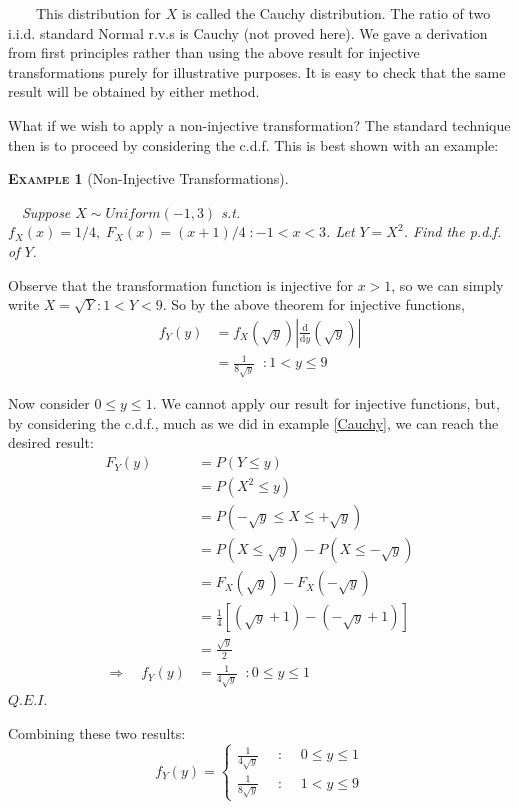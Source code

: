 \documentclass[12pt,a4paper]{article}
\newtheorem{example}{\textsc{Example}}[section]
\begin{document}
$\qquad$This distribution for $X$ is called the Cauchy distribution. The ratio of two i.i.d. standard Normal r.v.s is Cauchy (not proved here). We gave a derivation from first principles rather than using the above result for injective transformations purely for illustrative purposes. It is easy to check that the same result will be obtained by either method.

What if we wish to apply a non-injective transformation? The standard technique then is to proceed by considering the c.d.f. This is best shown with an example:

\begin{example}[Non-Injective Transformations]$\;$\par

$\quad$Suppose $X \sim Uniform(-1, 3)$ s.t. $f_X(x) = 1/4, \; F_X(x) = (x + 1)/4 \; : -1 < x < 3$. Let $Y = X^2$. Find the p.d.f. of $Y$.
\end{example}

Observe that the transformation function is injective for $x > 1$, so we can simply write $X = \sqrt Y : 1 < Y < 9$. So by the above theorem for injective functions,
\begin{align*}
f_Y(y) &= f_X(\sqrt y) \left| \frac{\mathrm{d}}{\mathrm{d}y}(\sqrt y) \right|\\
&= \frac{1}{8 \sqrt y} \;\; : 1 < y \leq 9
\end{align*}

Now consider $0 \leq y \leq 1$. We cannot apply our result for injective functions, but, by considering the c.d.f., much as we did in example \ref{Cauchy}, we can reach the desired result:
\begin{align*}
F_Y(y) &= P(Y \leq y)\\
&= P(X^2 \leq y)\\
&= P(-\sqrt y \leq X \leq +\sqrt y)\\
&= P(X \leq \sqrt y) - P(X \leq -\sqrt y)\\
&= F_X(\sqrt y) - F_X(- \sqrt y)\\
&= \frac{1}{4}[(\sqrt y + 1) - (-\sqrt y + 1)]\\
&= \frac{\sqrt y}{2}\\
\Rightarrow\quad f_Y(y) &= \frac{1}{4 \sqrt y} \; \; : 0 \leq y \leq 1
\end{align*}\hfill $Q.E.I.$

\noindent Combining these two results:
$$f_Y(y) = \left\{ \begin{array}{ccl} \frac{1}{4 \sqrt y} \;\; &: \;\; &0 \leq y \leq 1\\ \frac{1}{8 \sqrt y} \;\; &: \;\; &1 < y \leq 9 \end{array}\right.$$
\end{document}
